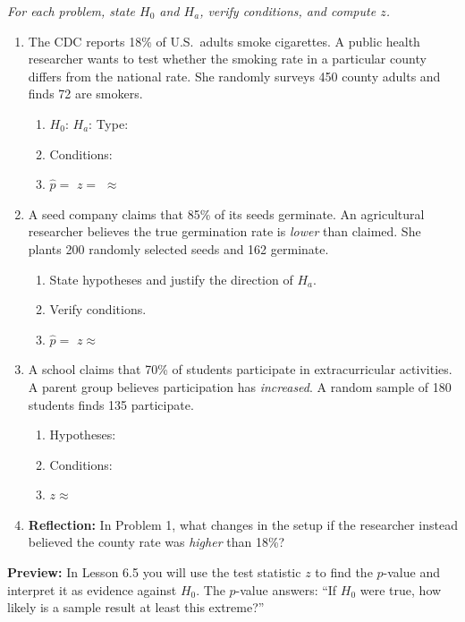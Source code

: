 \documentclass[10pt]{article}
\begin{document}
\namedateperiod

\vspace{0.15in}

\textit{For each problem, state $H_0$ and $H_a$, verify conditions, and compute $z$.}

\begin{enumerate}

  \item The CDC reports 18\% of U.S.\ adults smoke cigarettes. A public health researcher
        wants to test whether the smoking rate in a particular county differs from the national
        rate. She randomly surveys 450 county adults and finds 72 are smokers.
        \begin{enumerate}[label=\alph*.]
          \item $H_0$: \blank{5cm} \quad $H_a$: \blank{5cm} \quad Type: \blank{2cm}
          \item Conditions: 
          \item $\hat p = $ \blank{2cm} \quad $z = $ \blank{6cm} $\approx$ \blank{2cm}
        \end{enumerate}

  \item A seed company claims that 85\% of its seeds germinate. An agricultural researcher
        believes the true germination rate is \emph{lower} than claimed. She plants 200
        randomly selected seeds and 162 germinate.
        \begin{enumerate}[label=\alph*.]
          \item State hypotheses and justify the direction of $H_a$. 
          \item Verify conditions. 
          \item $\hat p = $ \blank{2cm} \quad $z \approx$ \blank{2cm}
        \end{enumerate}

  \item A school claims that 70\% of students participate in extracurricular activities.
        A parent group believes participation has \emph{increased}. A random sample of
        180 students finds 135 participate.
        \begin{enumerate}[label=\alph*.]
          \item Hypotheses: 
          \item Conditions: 
          \item $z \approx$ \blank{2cm}
        \end{enumerate}

  \item \textbf{Reflection:} In Problem 1, what changes in the setup if the researcher
        instead believed the county rate was \emph{higher} than 18\%? 

\end{enumerate}

\begin{reflectionbox}
\textbf{Preview:} In Lesson 6.5 you will use the test statistic $z$ to find the $p$-value
and interpret it as evidence against $H_0$. The $p$-value answers: ``If $H_0$ were true,
how likely is a sample result at least this extreme?''
\end{reflectionbox}
\end{document}
